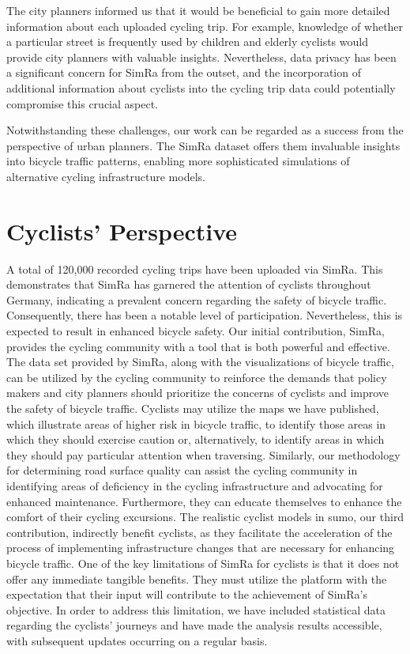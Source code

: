 The city planners informed us that it would be beneficial to gain more detailed information about each uploaded cycling trip.
For example, knowledge of whether a particular street is frequently used by children and elderly cyclists would provide city planners with valuable insights.
Nevertheless, data privacy has been a significant concern for SimRa from the outset, and the incorporation of additional information about cyclists into the cycling trip data could potentially compromise this crucial aspect.

Notwithstanding these challenges, our work can be regarded as a success from the perspective of urban planners. 
The SimRa dataset offers them invaluable insights into bicycle traffic patterns, enabling more sophisticated simulations of alternative cycling infrastructure models. 


\section*{Cyclists' Perspective}
A total of 120,000 recorded cycling trips have been uploaded via SimRa.  
This demonstrates that SimRa has garnered the attention of cyclists throughout Germany, indicating a prevalent concern regarding the safety of bicycle traffic.
Consequently, there has been a notable level of participation.
Nevertheless, this is expected to result in enhanced bicycle safety.
Our initial contribution, SimRa, provides the cycling community with a tool that is both powerful and effective.
The data set provided by SimRa, along with the visualizations of bicycle traffic, can be utilized by the cycling community to reinforce the demands that policy makers and city planners should prioritize the concerns of cyclists and improve the safety of bicycle traffic.
Cyclists may utilize the maps we have published, which illustrate areas of higher risk in bicycle traffic, to identify those areas in which they should exercise caution or, alternatively, to identify areas in which they should pay particular attention when traversing.
Similarly, our methodology for determining road surface quality can assist the cycling community in identifying areas of deficiency in the cycling infrastructure and advocating for enhanced maintenance.
Furthermore, they can educate themselves to enhance the comfort of their cycling excursions.
The realistic cyclist models in \ac{sumo}, our third contribution, indirectly benefit cyclists, as they facilitate the acceleration of the process of implementing infrastructure changes that are necessary for enhancing bicycle traffic.
One of the key limitations of SimRa for cyclists is that it does not offer any immediate tangible benefits.
They must utilize the platform with the expectation that their input will contribute to the achievement of SimRa's objective.
In order to address this limitation, we have included statistical data regarding the cyclists' journeys and have made the analysis results accessible, with subsequent updates occurring on a regular basis.

